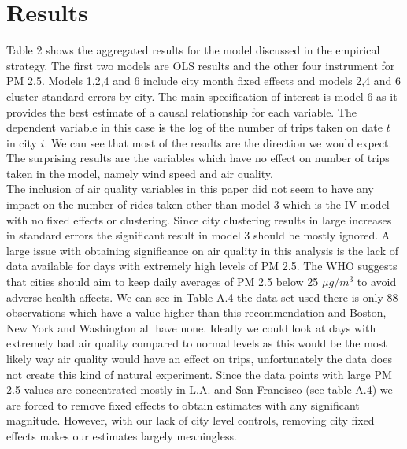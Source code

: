 \documentclass[12pt,letter paper]{article}
\begin{document}
\section{Results}
Table 2 shows the aggregated results for the model discussed in the empirical strategy.  The first two models are OLS results and the other four instrument for PM 2.5.  Models 1,2,4 and 6 include city month fixed effects and models 2,4 and 6 cluster standard errors by city.  The main specification of interest is model 6 as it provides the best estimate of a causal relationship for each variable.  The dependent variable in this case is the log of the number of trips taken on date $t$ in city $i$.  We can see that most of the results are the direction we would expect.  The surprising results are the variables which have no effect on number of trips taken in the model, namely wind speed and air quality.  \\

The inclusion of air quality variables in this paper did not seem to have any impact on the number of rides taken other than model 3 which is the IV model with no fixed effects or clustering.  Since city clustering results in large increases in standard errors the significant result in model 3 should be mostly ignored.  A large issue with obtaining significance on air quality in this analysis is the lack of data available for days with extremely high levels of PM 2.5.  The WHO suggests that cities should aim to keep daily averages of PM 2.5 below 25 $\mu g /m^3$ to avoid adverse health affects.  We can see in Table A.4 the data set used there is only 88 observations which have a value higher than this recommendation and Boston, New York and Washington all have none.  Ideally we could look at days with extremely bad air quality compared to normal levels as this would be the most likely way air quality would have an effect on trips, unfortunately the data does not create this kind of natural experiment.  Since the data points with large PM 2.5 values are concentrated mostly in L.A. and San Francisco (see table A.4) we are forced to remove fixed effects to obtain estimates with any significant magnitude.  However, with our lack of city level controls, removing city fixed effects makes our estimates  largely meaningless. \\
\end{document}
